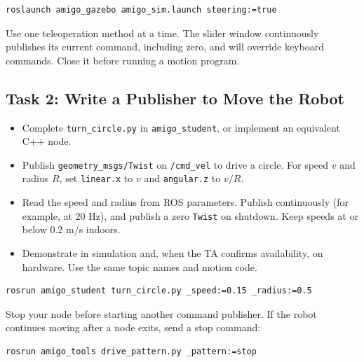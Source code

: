 \documentclass[12pt]{article}
\begin{document}
\begin{tcolorbox}
\begin{lstlisting}[language=bash]
roslaunch amigo_gazebo amigo_sim.launch steering:=true
\end{lstlisting}
\end{tcolorbox}

Use one teleoperation method at a time. The slider window continuously
publishes its current command, including zero, and will override keyboard
commands. Close it before running a motion program.

\subsection*{Task 2: Write a Publisher to Move the Robot}

\begin{itemize}
  \item Complete \texttt{turn\_circle.py} in \texttt{amigo\_student}, or implement an equivalent C++ node.
  \item Publish \texttt{geometry\_msgs/Twist} on \texttt{/cmd\_vel} to drive a circle. For speed $v$ and radius $R$, set \texttt{linear.x} to $v$ and \texttt{angular.z} to $v/R$.
  \item Read the speed and radius from ROS parameters. Publish continuously (for example, at 20 Hz), and publish a zero \texttt{Twist} on shutdown. Keep speeds at or below 0.2 m/s indoors.
  \item Demonstrate in simulation and, when the TA confirms availability, on hardware. Use the same topic names and motion code.
\end{itemize}

\begin{tcolorbox}
\begin{lstlisting}[language=bash]
rosrun amigo_student turn_circle.py _speed:=0.15 _radius:=0.5
\end{lstlisting}
\end{tcolorbox}

Stop your node before starting another command publisher. If the robot
continues moving after a node exits, send a stop command:

\begin{tcolorbox}
\begin{lstlisting}[language=bash]
rosrun amigo_tools drive_pattern.py _pattern:=stop
\end{lstlisting}
\end{tcolorbox}
\end{document}
